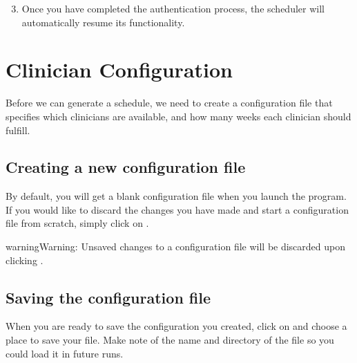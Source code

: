 \documentclass[letterpaper,10pt,english]{sphinxmanual}
\begin{document}
\begin{figure}[h!]
\centering
{}\end{figure}

\begin{DUlineblock}{0em}
\item[] 
\end{DUlineblock}
\begin{enumerate}
\setcounter{enumi}{2}
\item {} 
Once you have completed the authentication process, the scheduler will
automatically resume its functionality.

\end{enumerate}


\section{Clinician Configuration}
\label{\detokenize{index:clinician-configuration}}\label{\detokenize{index:id3}}
Before we can generate a schedule, we need to create a configuration file
that specifies which clinicians are available, and how many weeks each
clinician should fulfill.


\subsection{Creating a new configuration file}
\label{\detokenize{index:creating-a-new-configuration-file}}
By default, you will get a blank configuration file when you launch
the program. If you would like to discard the changes you have made and
start a configuration file from scratch, simply click on .

\begin{figure}[h!]
\centering
{}\end{figure}

\begin{sphinxadmonition}{warning}{Warning:}
Unsaved changes to a configuration file will be discarded upon clicking
.
\end{sphinxadmonition}


\subsection{Saving the configuration file}
\label{\detokenize{index:saving-the-configuration-file}}
When you are ready to save the configuration you created, click on
 and choose a place to save your file. Make note of the name
and directory of the file so you could load it in future runs.
\end{document}
